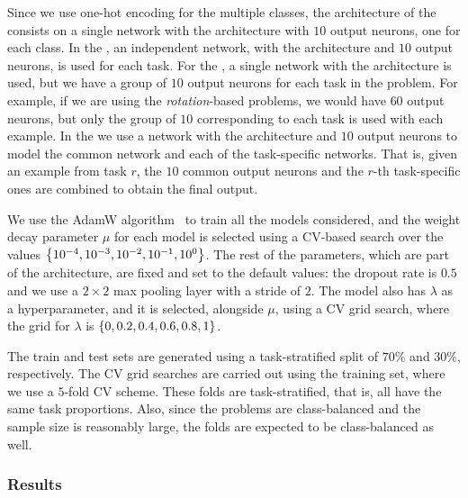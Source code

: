 %
Since we use one-hot encoding for the multiple classes, the architecture of the  consists on a single network with the  architecture with $10$ output neurons, one for each class.
%
In the , an independent network, with the  architecture and $10$ output neurons, is used for each task.
%
For the , a single network with the  architecture is used, but we have a group of $10$ output neurons for each task in the problem. For example, if we are using the \emph{rotation}-based problems, we would have $60$ output neurons, but only the group of $10$ corresponding to each task is used with each example.
%
In the  we use a network with the  architecture and $10$ output neurons to model the common network and each of the task-specific networks. That is, given an example from task $r$, the $10$ common output neurons and the  $r$-th task-specific ones are combined to obtain the final output. 

We use the AdamW algorithm~\citep{LoshchilovH19} to train all the models considered, and the weight decay parameter $\mu$ for each model is selected using a CV-based search over the values $\left\{10^{-4}, 10^{-3}, 10^{-2}, 10^{-1}, 10^{0}\right\}$. The rest of the parameters, which are part of the architecture, are fixed and set to the default values: the dropout rate is $0.5$ and we use a $2\times 2$ max pooling layer with a stride of $2$.
%
The  model also has $\lambda$ as a hyperparameter, and it is selected, alongside $\mu$, using a CV grid search, where the grid for $\lambda$ is $\left\{0, 0.2, 0.4, 0.6, 0.8, 1\right\}$.

%
The train and test sets are generated using a task-stratified split of $70\%$ and $30\%$, respectively.
The CV grid searches are carried out using the training set, where we use a $5$-fold CV scheme. These folds are task-stratified, that is, all have the same task proportions. Also, since the problems are class-balanced and the sample size is reasonably large, the folds are expected to be class-balanced as well.

\subsubsection*{Results}

